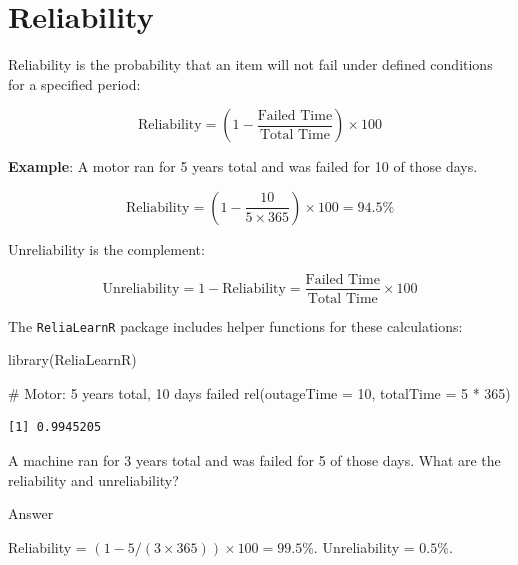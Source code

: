 \documentclass[
  letterpaper,
  DIV=11,
  numbers=noendperiod]{scrreprt}
\newenvironment{Shaded}{\begin{snugshade}}{\end{snugshade}}
\newcommand{\AttributeTok}[1]{\textcolor[rgb]{0.40,0.45,0.13}{#1}}
\newcommand{\CommentTok}[1]{\textcolor[rgb]{0.37,0.37,0.37}{#1}}
\newcommand{\DecValTok}[1]{\textcolor[rgb]{0.68,0.00,0.00}{#1}}
\newcommand{\FunctionTok}[1]{\textcolor[rgb]{0.28,0.35,0.67}{#1}}
\newcommand{\NormalTok}[1]{\textcolor[rgb]{0.00,0.23,0.31}{#1}}
\newcommand{\SpecialCharTok}[1]{\textcolor[rgb]{0.37,0.37,0.37}{#1}}
\begin{document}
\section{Reliability}\label{reliability}

Reliability is the probability that an item will not fail under defined
conditions for a specified period:

\[\text{Reliability} = \left(1 - \frac{\text{Failed Time}}{\text{Total Time}}\right) \times 100\]

\textbf{Example}: A motor ran for 5 years total and was failed for 10 of
those days.

\[\text{Reliability} = \left(1 - \frac{10}{5 \times 365}\right) \times 100 = 94.5\%\]

Unreliability is the complement:

\[\text{Unreliability} = 1 - \text{Reliability} = \frac{\text{Failed Time}}{\text{Total Time}} \times 100\]

The \texttt{ReliaLearnR} package includes helper functions for these
calculations:

\begin{Shaded}
\begin{Highlighting}[]
\FunctionTok{library}\NormalTok{(ReliaLearnR)}

\CommentTok{\# Motor: 5 years total, 10 days failed}
\FunctionTok{rel}\NormalTok{(}\AttributeTok{outageTime =} \DecValTok{10}\NormalTok{, }\AttributeTok{totalTime =} \DecValTok{5} \SpecialCharTok{*} \DecValTok{365}\NormalTok{)}
\end{Highlighting}
\end{Shaded}

\begin{verbatim}
[1] 0.9945205
\end{verbatim}

\begin{tcolorbox}[enhanced jigsaw, arc=.35mm, bottomrule=.15mm, bottomtitle=1mm, breakable, colback=white, colbacktitle=quarto-callout-tip-color!10!white, colframe=quarto-callout-tip-color-frame, coltitle=black, left=2mm, leftrule=.75mm, opacityback=0, opacitybacktitle=0.6, rightrule=.15mm, title=\textcolor{quarto-callout-tip-color}{\faLightbulb}\hspace{0.5em}{Review}, titlerule=0mm, toprule=.15mm, toptitle=1mm]

A machine ran for 3 years total and was failed for 5 of those days. What
are the reliability and unreliability?

Answer

Reliability = \((1 - 5/(3 \times 365)) \times 100 = 99.5\%\).
Unreliability = \(0.5\%\).

\end{tcolorbox}
\end{document}
